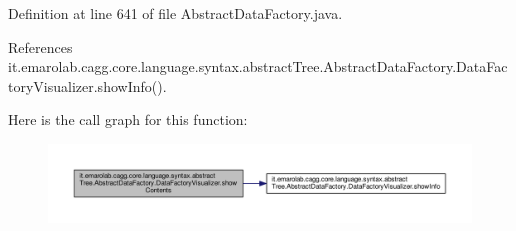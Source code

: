 Definition at line 641 of file Abstract\-Data\-Factory.\-java.



References it.\-emarolab.\-cagg.\-core.\-language.\-syntax.\-abstract\-Tree.\-Abstract\-Data\-Factory.\-Data\-Factory\-Visualizer.\-show\-Info().



Here is the call graph for this function\-:\nopagebreak
\begin{figure}[H]
\begin{center}
\leavevmode
\includegraphics[width=350pt]{classit_1_1emarolab_1_1cagg_1_1core_1_1language_1_1syntax_1_1abstractTree_1_1AbstractDataFactory_1_1DataFactoryVisualizer_a0e41cad16ef62a82aeacb66d5a3a8a4a_cgraph}
\end{center}
\end{figure}


